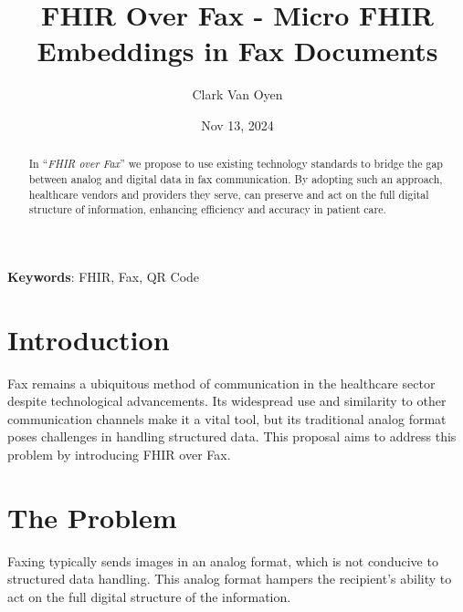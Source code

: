 \documentclass[12pt,a4paper]{article}
\title{FHIR Over Fax - Micro FHIR Embeddings in Fax Documents}
\author[1]{Clark Van Oyen}
\date{Nov 13, 2024}  %
\begin{document}
\maketitle

\begin{abstract}
In “\textit{FHIR over Fax}” we propose to use existing technology standards to bridge the gap between analog and digital data in fax communication. By adopting such an approach, healthcare vendors and providers they serve, can preserve and act on the full digital structure of information, enhancing efficiency and accuracy in patient care.
\end{abstract}

\textbf{Keywords}: FHIR, Fax, QR Code  





\section{Introduction}

Fax remains a ubiquitous method of communication in the healthcare sector despite technological advancements. Its widespread use and similarity to other communication channels make it a vital tool, but its traditional analog format poses challenges in handling structured data. This proposal aims to address this problem by introducing FHIR over Fax.

\section{The Problem}

Faxing typically sends images in an analog format, which is not conducive to structured data handling. This analog format hampers the recipient's ability to act on the full digital structure of the information.
\end{document}
